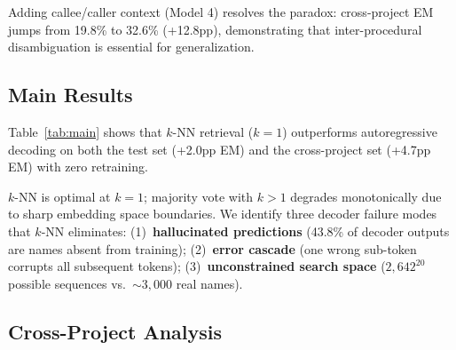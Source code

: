 \documentclass[sigconf,nonacm]{acmart}
\begin{document}
Adding callee/caller context (Model 4) resolves the paradox: cross-project EM jumps from 19.8\% to 32.6\% (+12.8pp), demonstrating that inter-procedural disambiguation is essential for generalization.

\subsection{Main Results}

\begin{table}[t]
    \centering
    \caption{Main results comparing decoder and $k$-NN hybrid inference.}
    \label{tab:main}
\end{table}

Table~\ref{tab:main} shows that $k$-NN retrieval ($k{=}1$) outperforms autoregressive decoding on both the test set (+2.0pp EM) and the cross-project set (+4.7pp EM) with zero retraining.

$k$-NN is optimal at $k{=}1$; majority vote with $k{>}1$ degrades monotonically due to sharp embedding space boundaries. We identify three decoder failure modes that $k$-NN eliminates: (1)~\textbf{hallucinated predictions} (43.8\% of decoder outputs are names absent from training); (2)~\textbf{error cascade} (one wrong sub-token corrupts all subsequent tokens); (3)~\textbf{unconstrained search space} ($2{,}642^{20}$ possible sequences vs.\ ${\sim}3{,}000$ real names).

\subsection{Cross-Project Analysis}
\end{document}
